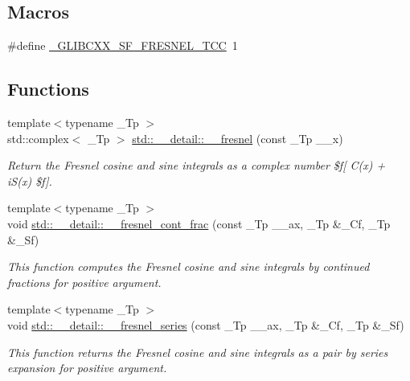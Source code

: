 \subsection*{Macros}
\begin{DoxyCompactItemize}
\item 
\#define \hyperlink{sf__fresnel_8tcc_a157a41147fba868fe64f89d64525188e}{\+\_\+\+G\+L\+I\+B\+C\+X\+X\+\_\+\+S\+F\+\_\+\+F\+R\+E\+S\+N\+E\+L\+\_\+\+T\+CC}~1
\end{DoxyCompactItemize}
\subsection*{Functions}
\begin{DoxyCompactItemize}
\item 
{\footnotesize template$<$typename \+\_\+\+Tp $>$ }\\std\+::complex$<$ \+\_\+\+Tp $>$ \hyperlink{namespacestd_1_1____detail_a322045015cfbde5a45e7718d533de60d}{std\+::\+\_\+\+\_\+detail\+::\+\_\+\+\_\+fresnel} (const \+\_\+\+Tp \+\_\+\+\_\+x)
\begin{DoxyCompactList}\small\item\em Return the Fresnel cosine and sine integrals as a complex number \$f\mbox{[} C(x) + i\+S(x) \$f\mbox{]}. \end{DoxyCompactList}\item 
{\footnotesize template$<$typename \+\_\+\+Tp $>$ }\\void \hyperlink{namespacestd_1_1____detail_aeae8420e2fa1671f004066525adc99b6}{std\+::\+\_\+\+\_\+detail\+::\+\_\+\+\_\+fresnel\+\_\+cont\+\_\+frac} (const \+\_\+\+Tp \+\_\+\+\_\+ax, \+\_\+\+Tp \&\+\_\+\+Cf, \+\_\+\+Tp \&\+\_\+\+Sf)
\begin{DoxyCompactList}\small\item\em This function computes the Fresnel cosine and sine integrals by continued fractions for positive argument. \end{DoxyCompactList}\item 
{\footnotesize template$<$typename \+\_\+\+Tp $>$ }\\void \hyperlink{namespacestd_1_1____detail_aae7775bc46d621e54fb9d994c2f35e2a}{std\+::\+\_\+\+\_\+detail\+::\+\_\+\+\_\+fresnel\+\_\+series} (const \+\_\+\+Tp \+\_\+\+\_\+ax, \+\_\+\+Tp \&\+\_\+\+Cf, \+\_\+\+Tp \&\+\_\+\+Sf)
\begin{DoxyCompactList}\small\item\em This function returns the Fresnel cosine and sine integrals as a pair by series expansion for positive argument. \end{DoxyCompactList}\end{DoxyCompactItemize}


